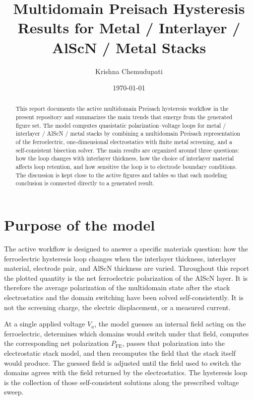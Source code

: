 \documentclass[11pt]{article}
\title{Multidomain Preisach Hysteresis Results for Metal / Interlayer / AlScN / Metal Stacks}
\author{Krishna Chemudupati}
\date{\today}
\begin{document}
\maketitle

\begin{abstract}
This report documents the active multidomain Preisach hysteresis workflow in the
present repository and summarizes the main trends that emerge from the generated
figure set. The model computes quasistatic polarization--voltage loops for
metal / interlayer / AlScN / metal stacks by combining a multidomain Preisach
representation of the ferroelectric, one-dimensional electrostatics with finite
metal screening, and a self-consistent bisection solver. The main results are
organized around three questions: how the loop changes with interlayer
thickness, how the choice of interlayer material affects loop retention, and
how sensitive the loop is to electrode boundary conditions. The discussion is
kept close to the active figures and tables so that each modeling conclusion is
connected directly to a generated result.
\end{abstract}

\tableofcontents
\clearpage

\section{Purpose of the model}

The active workflow is designed to answer a specific materials question: how
the ferroelectric hysteresis loop changes when the interlayer thickness,
interlayer material, electrode pair, and AlScN thickness are varied. Throughout
this report the plotted quantity is the net ferroelectric polarization of the
AlScN layer. It is therefore the average polarization of the multidomain state
after the stack electrostatics and the domain switching have been solved
self-consistently. It is not the screening charge, the electric displacement,
or a measured current.

At a single applied voltage $V_a$, the model guesses an internal field acting
on the ferroelectric, determines which domains would switch under that field,
computes the corresponding net polarization $P_{\mathrm{FE}}$, passes that
polarization into the electrostatic stack model, and then recomputes the field
that the stack itself would produce. The guessed field is adjusted until the
field used to switch the domains agrees with the field returned by the
electrostatics. The hysteresis loop is the collection of those self-consistent
solutions along the prescribed voltage sweep.
\end{document}
